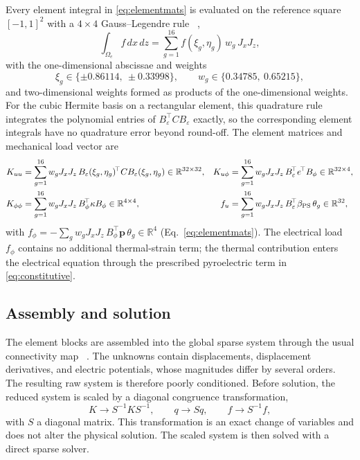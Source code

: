 \documentclass[pdflatex,sn-mathphys-num]{sn-jnl}
\begin{document}
Every element integral in \eqref{eq:elementmats} is evaluated on the reference square
$[-1,1]^2$ with a $4\times4$ Gauss--Legendre rule
~\cite{AbramowitzStegun1965,Gautschi2004},
\begin{equation}
\int_{\Omega_e}f\,dx\,dz
=\sum_{g=1}^{16}f(\xi_g,\eta_g)\,w_g\,J_xJ_z,
\label{eq:quad}
\end{equation}
with the one-dimensional abscissae and weights
\begin{equation}
\xi_g\in\{\pm0.86114,\ \pm0.33998\},\qquad
w_g\in\{0.34785,\ 0.65215\},
\label{eq:gaussweights}
\end{equation}
and two-dimensional weights formed as products of the one-dimensional weights.
For the cubic Hermite basis on a rectangular element, this quadrature rule integrates
the polynomial entries of $B_\varepsilon^{\!\top}CB_\varepsilon$ exactly, so the
corresponding element integrals have no quadrature error beyond round-off. The
element matrices and mechanical load vector are
\begin{align}
K_{uu}
&=\sum_{g=1}^{16}w_gJ_xJ_z\,
B_\varepsilon(\xi_g,\eta_g)^{\!\top}C
B_\varepsilon(\xi_g,\eta_g)
\in\mathbb{R}^{32\times32}, &
K_{u\phi}
&=\sum_{g=1}^{16}w_gJ_xJ_z\,
B_\varepsilon^{\!\top}e^{\!\top}B_\phi
\in\mathbb{R}^{32\times4},
\notag\\
K_{\phi\phi}
&=\sum_{g=1}^{16}w_gJ_xJ_z\,
B_\phi^{\!\top}\kappa B_\phi
\in\mathbb{R}^{4\times4}, &
f_u
&=\sum_{g=1}^{16}w_gJ_xJ_z\,
B_\varepsilon^{\!\top}\beta_{\mathrm{PS}}\,\theta_g
\in\mathbb{R}^{32},
\label{eq:elemsums}
\end{align}
with
$f_\phi=-\sum_g w_gJ_xJ_z\,B_\phi^{\!\top}\bm p\,\theta_g\in\mathbb{R}^4$
(Eq.~\eqref{eq:elementmats}). The electrical load $f_\phi$ contains no additional
thermal-strain term; the thermal contribution enters the electrical equation through
the prescribed pyroelectric term in \eqref{eq:constitutive}.

\subsection{Assembly and solution}
\label{sec:assembly}

The element blocks are assembled into the global sparse system through the usual
connectivity map ~\cite{Bathe1996}. The unknowns contain displacements, displacement
derivatives, and electric potentials, whose magnitudes differ by several orders.
The resulting raw system is therefore poorly conditioned. Before solution, the
reduced system is scaled by a diagonal congruence transformation,
\[
K\to S^{-1}KS^{-1},\qquad
q\to Sq,\qquad
f\to S^{-1}f,
\]
with $S$ a diagonal matrix. This transformation is an exact change of variables and
does not alter the physical solution. The scaled system is then solved with a direct
sparse solver.
\end{document}
